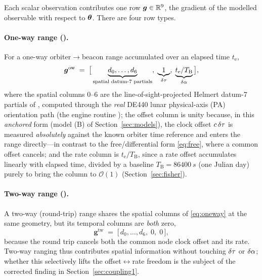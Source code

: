 Each scalar observation contributes one row $\bm g\in\mathbb{R}^{9}$, the gradient of the modelled
observable with respect to $\bm{\theta}$. There are four row types.

\paragraph{One-way range ().}
For a one-way orbiter$\to$beacon range accumulated over an elapsed time $t_{\mathrm e}$,
\begin{equation}
  \bm g^{\mathrm{ow}}
  \;=\;
  \bigl[\,\underbrace{d_0,\dots,d_6}_{\text{spatial datum-7 partials}},\;
          \underbrace{1}_{\delta\tau},\;
          \underbrace{t_{\mathrm e}/T_{\mathrm B}}_{\delta\alpha}\,\bigr],
  \label{eq:oneway}
\end{equation}
where the spatial columns $0$--$6$ are the line-of-sight-projected Helmert
datum-7 partials of \citep{baweja2026datum}, computed through the \emph{real} DE440
lunar physical-axis (PA) orientation path (the engine routine
); the offset column is unity because, in this
\emph{anchored} form (model (B) of Section~\ref{sec:models}), the clock offset $c\,\delta\tau$
is measured \emph{absolutely} against the known orbiter time reference and enters the range
directly---in contrast to the free/differential form \eqref{eq:free}, where a common offset
cancels; and the rate column is
$t_{\mathrm e}/T_{\mathrm B}$, since a rate offset accumulates linearly with elapsed time,
divided by a baseline $T_{\mathrm B}=\SI{86400}{s}$ (one Julian day) purely to bring the
column to $\mathcal{O}(1)$ (Section~\ref{sec:fisher}).

\paragraph{Two-way range ().}
A two-way (round-trip) range shares the spatial columns of \eqref{eq:oneway} at the same
geometry, but its temporal columns are \emph{both} zero,
\begin{equation}
  \bm g^{\mathrm{tw}}
  \;=\;
  \bigl[\,d_0,\dots,d_6,\;0,\;0\,\bigr],
  \label{eq:twoway}
\end{equation}
because the round trip cancels both the common node clock offset and its rate. Two-way
ranging thus contributes spatial information without touching $\delta\tau$ or $\delta\alpha$; whether
this selectively lifts the offset$\leftrightarrow$rate freedom is the subject of the
corrected finding in Section~\ref{sec:coupling1}.

